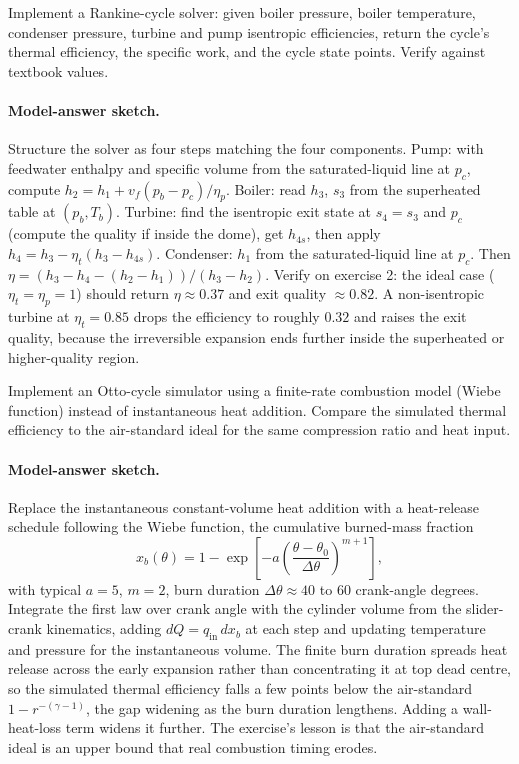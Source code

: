 \begin{exercise}
Implement a Rankine-cycle solver: given boiler pressure, boiler
temperature, condenser pressure, turbine and pump isentropic
efficiencies, return the cycle's thermal efficiency, the specific
work, and the cycle state points. Verify against textbook values.

\paragraph{Model-answer sketch.} Structure the solver as four steps
matching the four components. Pump: with feedwater enthalpy and specific
volume from the saturated-liquid line at $p_c$, compute $h_2 = h_1 +
v_f(p_b - p_c)/\eta_p$. Boiler: read $h_3$, $s_3$ from the superheated
table at $(p_b, T_b)$. Turbine: find the isentropic exit state at $s_4 =
s_3$ and $p_c$ (compute the quality if inside the dome), get $h_{4s}$,
then apply $h_4 = h_3 - \eta_t(h_3 - h_{4s})$. Condenser: $h_1$ from the
saturated-liquid line at $p_c$. Then $\eta = (h_3 - h_4 - (h_2 -
h_1))/(h_3 - h_2)$. Verify on exercise 2: the ideal case
($\eta_t = \eta_p = 1$) should return $\eta \approx 0.37$ and exit
quality $\approx 0.82$. A non-isentropic turbine at $\eta_t = 0.85$
drops the efficiency to roughly $0.32$ and raises the exit quality,
because the irreversible expansion ends further inside the superheated
or higher-quality region.
\end{exercise}

\begin{exercise}
Implement an Otto-cycle simulator using a finite-rate combustion
model (Wiebe function) instead of instantaneous heat addition.
Compare the simulated thermal efficiency to the air-standard ideal
for the same compression ratio and heat input.

\paragraph{Model-answer sketch.} Replace the instantaneous
constant-volume heat addition with a heat-release schedule following the
Wiebe function, the cumulative burned-mass fraction
\[
x_b(\theta) = 1 - \exp\!\left[-a\left(\frac{\theta -
\theta_0}{\Delta\theta}\right)^{m+1}\right],
\]
with typical $a = 5$, $m = 2$, burn duration $\Delta\theta \approx
40$ to $60$ crank-angle degrees. Integrate the first law over crank
angle with the cylinder volume from the slider-crank kinematics, adding
$dQ = q_{\text{in}} \, dx_b$ at each step and updating temperature and
pressure for the instantaneous volume. The finite burn duration spreads
heat release across the early expansion rather than concentrating it at
top dead centre, so the simulated thermal efficiency falls a few points
below the air-standard $1 - r^{-(\gamma-1)}$, the gap widening as the
burn duration lengthens. Adding a wall-heat-loss term widens it further.
The exercise's lesson is that the air-standard ideal is an upper bound
that real combustion timing erodes.
\end{exercise}


